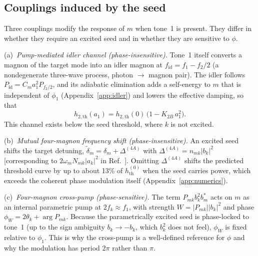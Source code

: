 \documentclass[aps,prb,reprint,superscriptaddress,floatfix]{revtex4-2}
\begin{document}
\subsection{Couplings induced by the seed}\label{sec:couplings}

Three couplings modify the response of $m$ when tone~1 is present. They differ in whether they require an excited seed and in whether they are sensitive to $\phi$.

(a)~\emph{Pump-mediated idler channel (phase-insensitive).} Tone~1 itself converts a magnon of the target mode into an idler magnon at $f_{\mathrm{id}}=f_1-f_2/2$ (a nondegenerate three-wave process, photon $\to$ magnon pair). The idler follows $P_{\mathrm{id}}=C_m a_1^2P_{f_2/2}$, and its adiabatic elimination adds a self-energy to $m$ that is independent of $\phi_1$ (Appendix~\ref{app:idler}) and lowers the effective damping, so that
\begin{equation}
h_{2,\mathrm{th}}(a_1)=h_{2,\mathrm{th}}(0)\,\big(1-K_{2B}\,a_1^2\big).
\label{eq:K2B}
\end{equation}
This channel exists below the seed threshold, where $k$ is not excited.

(b)~\emph{Mutual four-magnon frequency shift (phase-insensitive).} An excited seed shifts the target detuning, $\tilde\delta_m=\delta_m+\Delta^{(4A)}$ with $\Delta^{(4A)}=n_{mk}|b_k|^2$ [corresponding to $2\omega_mN_{mk}|a_k|^2$ in Ref.~\cite{daquino26}]. Omitting $\Delta^{(4A)}$ shifts the predicted threshold curve by up to about 13\% of $h^{(0)}_{\mathrm{th}}$ when the seed carries power, which exceeds the coherent phase modulation itself (Appendix~\ref{app:numerics}).

(c)~\emph{Four-magnon cross-pump (phase-sensitive).} The term $P_{mk}b_k^2b_m^*$ acts on $m$ as an internal parametric pump at $2f_k\approx f_1$, with strength $W=|P_{mk}||b_k|^2$ and phase $\phi_W=2\theta_k+\arg P_{mk}$. Because the parametrically excited seed is phase-locked to tone~1 (up to the sign ambiguity $b_k\to-b_k$, which $b_k^2$ does not feel), $\phi_W$ is fixed relative to $\phi_1$. This is why the cross-pump is a well-defined reference for $\phi$ and why the modulation has period $2\pi$ rather than $\pi$.
\end{document}
